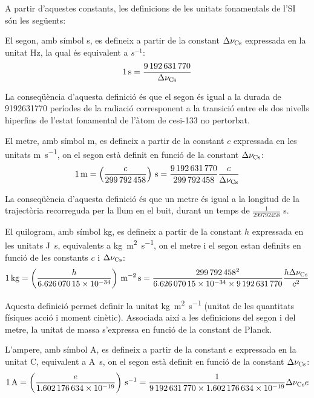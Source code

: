 A partir d'aquestes constants, les definicions de les unitats fonamentals de l'SI són les següents:
\begin{list}{}
   {\setlength{\labelwidth}{22mm} \setlength{\leftmargin}{22mm} \setlength{\labelsep}{2mm}}
   \item[\textbf{segon}] El segon, amb símbol s, es defineix a partir de la constant $\Delta\nu_\mathrm{Cs}$ expressada en la unitat Hz, la qual és equivalent a $\unit{s^{-1}}$:
       \[
            \qty{1}{s} = \frac{\num{9192631770}}{\Delta\nu_\mathrm{Cs}}
       \]

    La conseqüència d'aquesta definició és que el segon és igual a la durada de \num{9192631770} períodes de la
   radiació corresponent a la transició entre els dos nivells
  hiperfins de l'estat fonamental de l'àtom de cesi-133 no pertorbat.

   \item[\textbf{metre}]  El metre, amb símbol m, es defineix a partir de la constant $c$ expressada en les unitats \unit{m.s^{-1}}, on el segon està definit en funció de la constant  $\Delta\nu_\mathrm{Cs}$:
       \[
            \qty{1}{m} = \left(\frac{c}{\num{299792458}}\right)\unit{\,s} = \frac{\num{9192631770}}{\num{299792458}}\frac{c}{\Delta\nu\ped{Cs}}
       \]

    La conseqüència d'aquesta definició és que un metre és igual a la longitud de la trajectòria recorreguda per la llum
   en el buit, durant un temps de $\frac{1}{\num{299792458}}$ s.

   \item[\textbf{quilogram}] El quilogram, amb símbol kg, es defineix a partir de la constant $h$ expressada en les unitats \unit{J.s}, equivalents a \unit{kg.m^2.s^{-1}}, on el metre i el segon estan definits en funció de les constants $c$ i $\Delta\nu_\mathrm{Cs}$:
       \[
            \qty{1}{kg} = \left(\frac{h}{\num{6,62607015 e-34}}\right)\unit{\,m^{-2}.s} = \frac{\num{299792458}^2}{\num{6,62607015 e-34}\times\num{9192631770}}\frac{h\Delta\nu\ped{Cs}}{c^2}
       \]

   Aquesta definició permet definir la unitat \unit{kg.m^2.s^{-1}} (unitat de les quantitats físiques acció i moment cinètic). Associada així a les definicions del segon i del metre,  la unitat de massa s'expressa en funció  de la constant de Planck.


   \item[\textbf{ampere}] L'ampere, amb símbol A, es defineix a partir de la constant $e$ expressada en la unitat C,  equivalent a \unit{A.s}, on el segon està definit en funció de la constant  $\Delta\nu_\mathrm{Cs}$:
       \[
            \qty{1}{A} = \left(\frac{e}{\num{1,602176634 e-19}}\right)\unit{\,s^{-1}} = \frac{1}{\num{9192631770}\times\num{1,602176634 e-19}} \Delta\nu\ped{Cs} e
       \]


\end{list}
